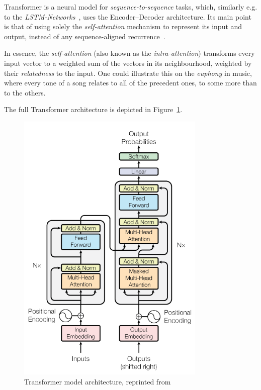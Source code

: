 Transformer is a neural model for \textit{sequence-to-sequence} tasks, which, similarly e.g. to the \textit{LSTM-Networks}~\cite{lstm}, uses the Encoder--Decoder architecture. Its main point is that of using solely the \textit{self-attention} mechanism to represent its input and output, instead of any sequence-aligned recurrence~\cite{vaswani}.

In essence, the \textit{self-attention} (also known as the \textit{intra-attention}) transforms every input vector to a weighted sum of the vectors in its neighbourhood, weighted by their \textit{relatedness} to the input. One could illustrate this on the \textit{euphony} in music, where every tone of a song relates to all of the precedent ones, to some more than to the others.

The full Transformer architecture is depicted in Figure~\ref{fig:transformer}.
\begin{figure}
\includegraphics[width=9cm]{fig/transformer.pdf}
\caption{Transformer model architecture, reprinted from~\cite{vaswani}}
\label{fig:transformer}
\end{figure}



